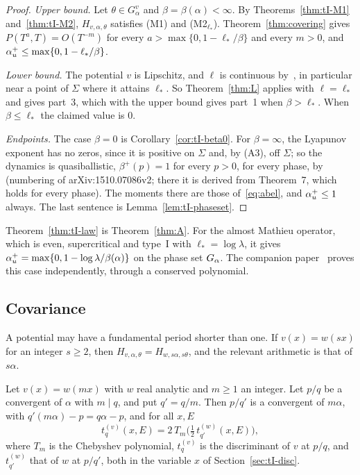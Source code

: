 \begin{proof}
\emph{Upper bound.} Let $\theta\in G^v_\alpha$ and $\beta=\beta(\alpha)<\infty$. By Theorems~\ref{thm:tI-M1} and~\ref{thm:tI-M2}, $H_{v,\alpha,\theta}$ satisfies (M1) and (M2$_{\ell_*}$). Theorem~\ref{thm:covering} gives $P(T^a,T)=O(T^{-m})$ for every $a>\max\{0,1-\ell_*/\beta\}$ and every $m>0$, and $\alpha_u^+\le\max\{0,1-\ell_*/\beta\}$.

\emph{Lower bound.} The potential $v$ is Lipschitz, and $\ell$ is continuous by~\cite[Theorem~1]{BourgainJitomirskaya2002}, in particular near a point of $\Sigma$ where it attains $\ell_*$. So Theorem~\ref{thm:L} applies with $\ell=\ell_*$ and gives part~3, which with the upper bound gives part~1 when $\beta>\ell_*$. When $\beta\le\ell_*$ the claimed value is $0$.

\emph{Endpoints.} The case $\beta=0$ is Corollary~\ref{cor:tI-beta0}. For $\beta=\infty$, the Lyapunov exponent has no zeros, since it is positive on $\Sigma$ and, by (A3), off $\Sigma$; so the dynamics is quasiballistic, $\beta^+(p)=1$ for every $p>0$, for every phase, by~\cite[Theorem~3(2)]{JZ2022} (numbering of arXiv:1510.07086v2; there it is derived from Theorem~7, which holds for every phase). The moments there are those of~\eqref{eq:abel}, and $\alpha_u^+\le1$ always. The last sentence is Lemma~\ref{lem:tI-phaseset}.
\end{proof}

Theorem~\ref{thm:tI-law} is Theorem~\ref{thm:A}. For the almost Mathieu operator, which is even, supercritical and type~I with $\ell_*=\log\lambda$, it gives $\alpha_u^+=\max\{0,1-\log\lambda/\beta(\alpha)\}$ on the phase set $G_\alpha$. The companion paper~\cite{DMamo} proves this case independently, through a conserved polynomial.

\subsection{Covariance}\label{sec:tI-cov}

A potential may have a fundamental period shorter than one. If $v(x)=w(sx)$ for an integer $s\ge2$, then $H_{v,\alpha,\theta}=H_{w,s\alpha,s\theta}$, and the relevant arithmetic is that of $s\alpha$.

\begin{proposition}\label{prop:tI-cheb}
Let $v(x)=w(mx)$ with $w$ real analytic and $m\ge1$ an integer. Let $p/q$ be a convergent of $\alpha$ with $m\mid q$, and put $q'=q/m$. Then $p/q'$ is a convergent of $m\alpha$, with $q'(m\alpha)-p=q\alpha-p$, and for all $x,E$
\[
t^{(v)}_q(x,E)=2\,T_m\bigl(\tfrac12\,t^{(w)}_{q'}(x,E)\bigr),
\]
where $T_m$ is the Chebyshev polynomial, $t^{(v)}_q$ is the discriminant of $v$ at $p/q$, and $t^{(w)}_{q'}$ that of $w$ at $p/q'$, both in the variable $x$ of Section~\ref{sec:tI-disc}.
\end{proposition}

